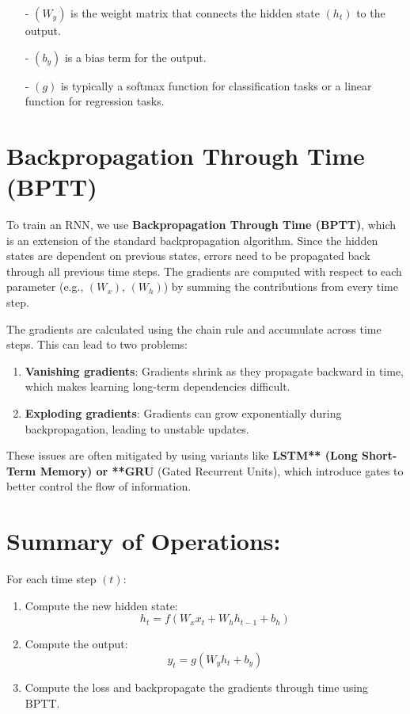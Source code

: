 \documentclass[10pt]{article}
\begin{document}
\begin{itemize}
   \item [-] $( W_y )$ is the weight matrix that connects the hidden state $( h_t )$ to the output.
   \item [-] $( b_y )$ is a bias term for the output.
   \item [-] $( g )$ is typically a softmax function for classification tasks or a linear function for regression tasks.
\end{itemize}

\section{ Backpropagation Through Time (BPTT)}
To train an RNN, we use {\bf Backpropagation Through Time (BPTT)}, which is an extension of the standard backpropagation algorithm. Since the hidden states are dependent on previous states, errors need to be propagated back through all previous time steps. The gradients are computed with respect to each parameter (e.g., $( W_x )$, $( W_h )$) by summing the contributions from every time step.

The gradients are calculated using the chain rule and accumulate across time steps. This can lead to two problems:

\begin{enumerate}
   \item {\bf Vanishing gradients}: Gradients shrink as they propagate backward in time, which makes learning long-term dependencies difficult.
   \item {\bf Exploding gradients}: Gradients can grow exponentially during backpropagation, leading to unstable updates.
\end{enumerate}

These issues are often mitigated by using variants like {\bf LSTM** (Long Short-Term Memory) or **GRU} (Gated Recurrent Units), which introduce gates to better control the flow of information.

\section{ Summary of Operations:}
For each time step $( t )$:

\begin{enumerate}
   \item Compute the new hidden state:
      $$
      h_t = f(W_x x_t + W_h h_{t-1} + b_h)
      $$
   \item Compute the output:
      $$
      y_t = g(W_y h_t + b_y)
      $$
   \item Compute the loss and backpropagate the gradients through time using BPTT.
\end{enumerate}
\end{document}
